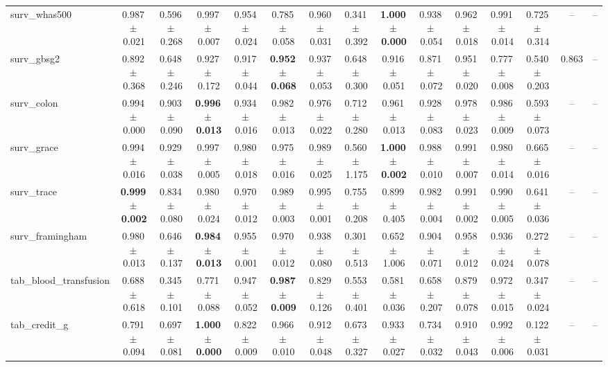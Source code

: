 \documentclass[8pt]{extarticle}
\begin{document}
\begin{longtable}{l*{14}{c}}
surv\_whas500 & 0.987\,$\pm$\,0.021 & 0.596\,$\pm$\,0.268 & 0.997\,$\pm$\,0.007 & 0.954\,$\pm$\,0.024 & 0.785\,$\pm$\,0.058 & 0.960\,$\pm$\,0.031 & 0.341\,$\pm$\,0.392 & \textbf{1.000\,$\pm$\,0.000} & 0.938\,$\pm$\,0.054 & 0.962\,$\pm$\,0.018 & 0.991\,$\pm$\,0.014 & 0.725\,$\pm$\,0.314 & -- & -- \\
surv\_gbsg2 & 0.892\,$\pm$\,0.368 & 0.648\,$\pm$\,0.246 & 0.927\,$\pm$\,0.172 & 0.917\,$\pm$\,0.044 & \textbf{0.952\,$\pm$\,0.068} & 0.937\,$\pm$\,0.053 & 0.648\,$\pm$\,0.300 & 0.916\,$\pm$\,0.051 & 0.871\,$\pm$\,0.072 & 0.951\,$\pm$\,0.020 & 0.777\,$\pm$\,0.008 & 0.540\,$\pm$\,0.203 & 0.863 & -- \\
surv\_colon & 0.994\,$\pm$\,0.000 & 0.903\,$\pm$\,0.090 & \textbf{0.996\,$\pm$\,0.013} & 0.934\,$\pm$\,0.016 & 0.982\,$\pm$\,0.013 & 0.976\,$\pm$\,0.022 & 0.712\,$\pm$\,0.280 & 0.961\,$\pm$\,0.013 & 0.928\,$\pm$\,0.083 & 0.978\,$\pm$\,0.023 & 0.986\,$\pm$\,0.009 & 0.593\,$\pm$\,0.073 & -- & -- \\
surv\_grace & 0.994\,$\pm$\,0.016 & 0.929\,$\pm$\,0.038 & 0.997\,$\pm$\,0.005 & 0.980\,$\pm$\,0.018 & 0.975\,$\pm$\,0.016 & 0.989\,$\pm$\,0.025 & 0.560\,$\pm$\,1.175 & \textbf{1.000\,$\pm$\,0.002} & 0.988\,$\pm$\,0.010 & 0.991\,$\pm$\,0.007 & 0.980\,$\pm$\,0.014 & 0.665\,$\pm$\,0.016 & -- & -- \\
surv\_trace & \textbf{0.999\,$\pm$\,0.002} & 0.834\,$\pm$\,0.080 & 0.980\,$\pm$\,0.024 & 0.970\,$\pm$\,0.012 & 0.989\,$\pm$\,0.003 & 0.995\,$\pm$\,0.001 & 0.755\,$\pm$\,0.208 & 0.899\,$\pm$\,0.405 & 0.982\,$\pm$\,0.004 & 0.991\,$\pm$\,0.002 & 0.990\,$\pm$\,0.005 & 0.641\,$\pm$\,0.036 & -- & -- \\
surv\_framingham & 0.980\,$\pm$\,0.013 & 0.646\,$\pm$\,0.137 & \textbf{0.984\,$\pm$\,0.013} & 0.955\,$\pm$\,0.001 & 0.970\,$\pm$\,0.012 & 0.938\,$\pm$\,0.080 & 0.301\,$\pm$\,0.513 & 0.652\,$\pm$\,1.006 & 0.904\,$\pm$\,0.071 & 0.958\,$\pm$\,0.012 & 0.936\,$\pm$\,0.024 & 0.272\,$\pm$\,0.078 & -- & -- \\
tab\_blood\_transfusion & 0.688\,$\pm$\,0.618 & 0.345\,$\pm$\,0.101 & 0.771\,$\pm$\,0.088 & 0.947\,$\pm$\,0.052 & \textbf{0.987\,$\pm$\,0.009} & 0.829\,$\pm$\,0.126 & 0.553\,$\pm$\,0.401 & 0.581\,$\pm$\,0.036 & 0.658\,$\pm$\,0.207 & 0.879\,$\pm$\,0.078 & 0.972\,$\pm$\,0.015 & 0.347\,$\pm$\,0.024 & -- & -- \\
tab\_credit\_g & 0.791\,$\pm$\,0.094 & 0.697\,$\pm$\,0.081 & \textbf{1.000\,$\pm$\,0.000} & 0.822\,$\pm$\,0.009 & 0.966\,$\pm$\,0.010 & 0.912\,$\pm$\,0.048 & 0.673\,$\pm$\,0.327 & 0.933\,$\pm$\,0.027 & 0.734\,$\pm$\,0.032 & 0.910\,$\pm$\,0.043 & 0.992\,$\pm$\,0.006 & 0.122\,$\pm$\,0.031 & -- & -- \\

\end{longtable}
\end{document}
